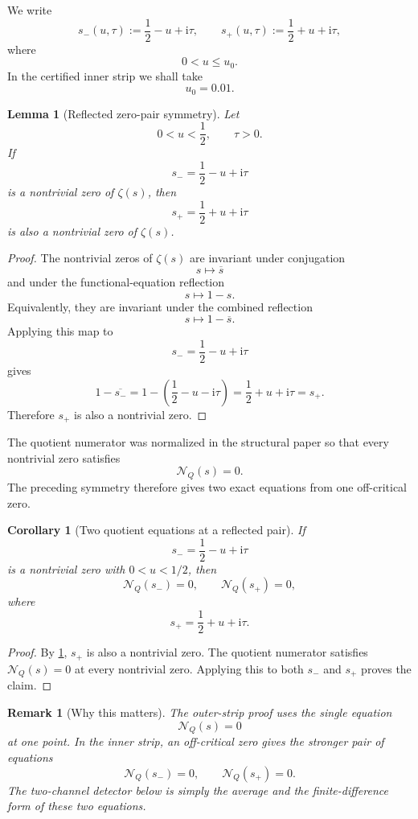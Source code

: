 \documentclass[11pt]{article}
\newtheorem{lemma}[theorem]{Lemma}
\newtheorem{corollary}[theorem]{Corollary}
\newtheorem{remark}[theorem]{Remark}
\newcommand{\ii}{\mathrm{i}}
\newcommand{\NQ}{\mathcal N_Q}
\begin{document}
We write
\[
        s_-(u,\tau)
        :=
        \frac12-u+\ii\tau,
        \qquad
        s_+(u,\tau)
        :=
        \frac12+u+\ii\tau,
\]
where
\[
        0<u\le u_0.
\]
In the certified inner strip we shall take
\[
        u_0=0.01.
\]

\begin{lemma}[Reflected zero-pair symmetry]
\label{lem:reflected-zero-pair}
Let
\[
        0<u<\frac12,
        \qquad
        \tau>0.
\]
If
\[
        s_-=\frac12-u+\ii\tau
\]
is a nontrivial zero of \(\zeta(s)\), then
\[
        s_+=\frac12+u+\ii\tau
\]
is also a nontrivial zero of \(\zeta(s)\).
\end{lemma}

\begin{proof}
The nontrivial zeros of \(\zeta(s)\) are invariant under conjugation
\[
        s\mapsto \overline{s}
\]
and under the functional-equation reflection
\[
        s\mapsto 1-s.
\]
Equivalently, they are invariant under the combined reflection
\[
        s\mapsto 1-\overline{s}.
\]
Applying this map to
\[
        s_-=\frac12-u+\ii\tau
\]
gives
\[
        1-\overline{s_-}
        =
        1-\left(\frac12-u-\ii\tau\right)
        =
        \frac12+u+\ii\tau
        =
        s_+.
\]
Therefore \(s_+\) is also a nontrivial zero.
\end{proof}

The quotient numerator was normalized in the structural paper so that every
nontrivial zero satisfies
\[
        \NQ(s)=0.
\]
The preceding symmetry therefore gives two exact equations from one
off-critical zero.

\begin{corollary}[Two quotient equations at a reflected pair]
\label{cor:two-quotient-equations}
If
\[
        s_-=\frac12-u+\ii\tau
\]
is a nontrivial zero with \(0<u<1/2\), then
\[
        \NQ(s_-)=0,
        \qquad
        \NQ(s_+)=0,
\]
where
\[
        s_+=\frac12+u+\ii\tau.
\]
\end{corollary}

\begin{proof}
By \cref{lem:reflected-zero-pair}, \(s_+\) is also a nontrivial zero.  The
quotient numerator satisfies \(\NQ(s)=0\) at every nontrivial zero.  Applying
this to both \(s_-\) and \(s_+\) proves the claim.
\end{proof}

\begin{remark}[Why this matters]
The outer-strip proof uses the single equation
\[
        \NQ(s)=0
\]
at one point.  In the inner strip, an off-critical zero gives the stronger
pair of equations
\[
        \NQ(s_-)=0,
        \qquad
        \NQ(s_+)=0.
\]
The two-channel detector below is simply the average and the finite-difference
form of these two equations.
\end{remark}
\end{document}
